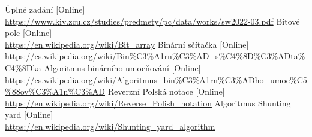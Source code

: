 \begin{thebibliography}{1}
\small{Úplné zadání
[Online]\\
\url{https://www.kiv.zcu.cz/studies/predmety/pc/data/works/sw2022-03.pdf}
}
\small{Bitové pole
[Online]\\
\url{https://en.wikipedia.org/wiki/Bit_array}
}
\small{Binární sčítačka
[Online]\\
\url{https://cs.wikipedia.org/wiki/Bin%C3%A1rn%C3%AD_s%C4%8D%C3%ADta%C4%8Dka}
}
\small{Algoritmus binárního umocňování
[Online]\\
\url{https://cs.wikipedia.org/wiki/Algoritmus_bin%C3%A1rn%C3%ADho_umoc%C5%88ov%C3%A1n%C3%AD}
}
\small{Reverzní Polská notace
[Online]\\
\url{https://en.wikipedia.org/wiki/Reverse_Polish_notation}
}
\small{Algoritmus Shunting yard
[Online]\\
\url{https://en.wikipedia.org/wiki/Shunting_yard_algorithm}
}
\end{thebibliography}